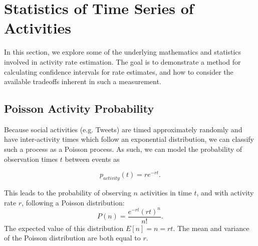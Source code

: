 \documentclass{article}
\begin{document}
\section{Statistics of Time Series of Activities} 
\label{time}

In this section, we explore some of the underlying mathematics and statistics involved in 
activity rate estimation. The goal is to demonstrate a method for calculating confidence 
intervals for rate estimates, and how to consider the available tradeoffs inherent in such 
a measurement.


\subsection{Poisson Activity Probability} 
\label{poisson}

Because 
\reversemarginpar\marginpar{\raggedleft
%
    \begin{tikzpicture}[scale=0.26]]
\draw [red, very thick, rotate around={60: (0, 0)}] (-0.7, -0.7) rectangle(0.7, 0.7);
%
\draw [very thick, <->] (0.25000000000000006, 0.4330127018922193) -- (1.25, 2.165063509461097) ;
\draw [very thick, <->] (1.75, 2.165063509461097) -- (2.75, 0.4330127018922193) ;
\draw [very thick, <->] (2.5, 0) -- (0.5, 0) ;
%
\draw [orange, ultra thick] (0,0) circle [radius= 0.5 ];
\draw [yellow, ultra thick] ( 1.5 , 2.59807621135 ) circle [radius= 0.5 ];
\draw [green,  ultra thick] ( 3.0 , 0 ) circle [radius= 0.5 ];
    \end{tikzpicture}
%
%
}
social activities (e.g. Tweets) are timed approximately randomly and have inter-activity 
times which follow an exponential distribution, we can classify such a process as a Poisson 
process. As such, we can model the probability of observation times $t$ between events as 

\begin{equation}
    \label{eq:tbe}
    p_{activity}(t) = r e^{-r t}.
\end{equation}

This leads to the probability of observing $n$ activities in time $t$, and with activity rate $r$, 
following a Poisson distribution:
\begin{equation}
    \label{eq:poisson}
    P(n) = \frac{e^{-r t} (r t)^n}{n!}.
\end{equation}
The expected value of this distribution $E[n]=n=rt$. The mean and variance of the Poisson distribution are 
both equal to $r$\cite{tbd}.
\end{document}
